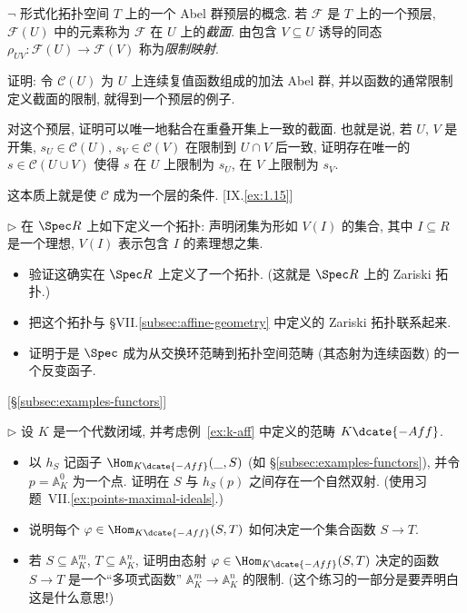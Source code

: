\begin{prob}\label{ex:presheaf-ab-groups}
$\neg$ 形式化拓扑空间 $T$ 上的一个 Abel 群预层的概念. 若 $\mathcal{F}$ 是 $T$ 上的一个预层, $\mathcal{F}(U)$ 中的元素称为 $\mathcal{F}$ 在 $U$ 上的\emph{截面}. 由包含 $V\subseteq U$ 诱导的同态 $\rho_{UV}:\mathcal{F}(U)\to\mathcal{F}(V)$ 称为\emph{限制映射}.

证明: 令 $\mathcal{C}(U)$ 为 $U$ 上连续复值函数组成的加法 Abel 群, 并以函数的通常限制定义截面的限制, 就得到一个预层的例子.

对这个预层, 证明可以唯一地黏合在重叠开集上一致的截面. 也就是说, 若 $U$, $V$ 是开集, $s_U\in\mathcal{C}(U)$, $s_V\in\mathcal{C}(V)$ 在限制到 $U\cap V$ 后一致, 证明存在唯一的 $s\in\mathcal{C}(U\cup V)$ 使得 $s$ 在 $U$ 上限制为 $s_U$, 在 $V$ 上限制为 $s_V$.

这本质上就是使 $\mathcal{C}$ 成为一个层的条件. [IX.\ref{ex:1.15}]
\end{prob}

\begin{prob}\label{ex:spec-zariski}
$\triangleright$ 在 $\Spec R$ 上如下定义一个拓扑: 声明闭集为形如 $V(I)$ 的集合, 其中 $I\subseteq R$ 是一个理想, $V(I)$ 表示包含 $I$ 的素理想之集.

\begin{itemize}
\item 验证这确实在 $\Spec R$ 上定义了一个拓扑. (这就是 $\Spec R$ 上的 Zariski 拓扑.)
\item 把这个拓扑与 §VII.\ref{subsec:affine-geometry} 中定义的 Zariski 拓扑联系起来.
\item 证明于是 $\Spec$ 成为从交换环范畴到拓扑空间范畴 (其态射为连续函数) 的一个反变函子.
\end{itemize}
[\S\ref{subsec:examples-functors}]
\end{prob}

\begin{prob}\label{ex:k-aff-points}
$\triangleright$ 设 $K$ 是一个代数闭域, 并考虑例~\ref{ex:k-aff} 中定义的范畴 $K\dcate{-Aff}$.

\begin{itemize}
\item 以 $h_S$ 记函子 $\Hom_{K\dcate{-Aff}}(\_,S)$ (如 §\ref{subsec:examples-functors}), 并令 $p=\mathbb{A}_K^0$ 为一个点. 证明在 $S$ 与 $h_S(p)$ 之间存在一个自然双射. (使用习题~VII.\ref{ex:points-maximal-ideals}.)
\item 说明每个 $\varphi\in\Hom_{K\dcate{-Aff}}(S,T)$ 如何决定一个集合函数 $S\to T$.
\item 若 $S\subseteq\mathbb{A}_K^m$, $T\subseteq\mathbb{A}_K^n$, 证明由态射 $\varphi\in\Hom_{K\dcate{-Aff}}(S,T)$ 决定的函数 $S\to T$ 是一个``多项式函数'' $\mathbb{A}_K^m\to\mathbb{A}_K^n$ 的限制. (这个练习的一部分是要弄明白这是什么意思!)
\end{itemize}
\end{prob}

